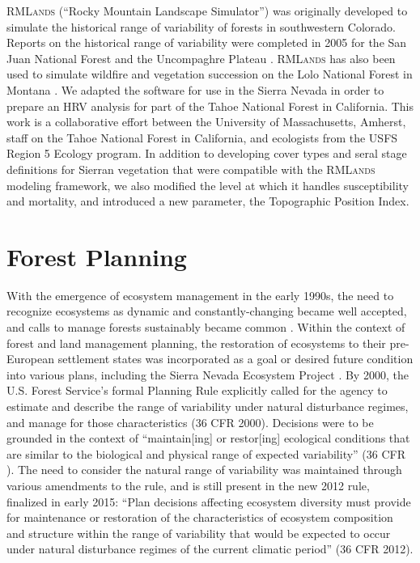 \textsc{RMLands} (``Rocky Mountain Landscape Simulator'') was originally developed to simulate the historical range of variability of forests in southwestern Colorado. Reports on the historical range of variability were completed in 2005 for the San Juan National Forest and the Uncompaghre Plateau \citep{McGarigal2005,McGarigal2005a}. \textsc{RMLands} has also been used to simulate wildfire and vegetation succession on the Lolo National Forest in Montana \citep{Cushman2011}. We adapted the software for use in the Sierra Nevada in order to prepare an HRV analysis for part of the Tahoe National Forest in California. This work is a collaborative effort between the University of Massachusetts, Amherst, staff on the Tahoe National Forest in California, and ecologists from the USFS Region 5 Ecology program. In addition to developing cover types and seral stage definitions for Sierran vegetation that were compatible with the \textsc{RMLands} modeling framework, we also modified the level at which it handles susceptibility and mortality, and introduced a new parameter, the Topographic Position Index.





\section{Forest Planning}

With the emergence of ecosystem management in the early 1990s, the need to recognize ecosystems as dynamic and constantly-changing became well accepted, and calls to manage forests sustainably became common \citep{Christensen1996}. Within the context of forest and land management planning, the restoration of ecosystems to their pre-European settlement states was incorporated as a goal or desired future condition into various plans, including the Sierra Nevada Ecosystem Project \cite{SNEP1996a}. By 2000, the U.S. Forest Service's formal Planning Rule explicitly called for the agency to estimate and describe the range of variability under natural disturbance regimes, and manage for those characteristics (36 CFR  2000). Decisions were to be grounded in the context of ``maintain[ing] or restor[ing] ecological conditions that are similar to the biological and physical range of expected variability'' (36 CFR ). The need to consider the natural range of variability was maintained through various amendments to the rule, and is still present in the new 2012 rule, finalized in early 2015: ``Plan decisions affecting ecosystem diversity must provide for maintenance or restoration of the characteristics of ecosystem composition and structure within the range of variability that would be expected to occur under natural disturbance regimes of the current climatic period'' (36 CFR  2012). 

